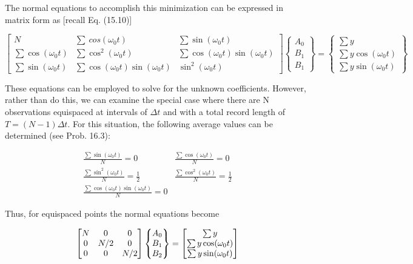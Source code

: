 \documentclass[../main.tex]{subfiles}
\begin{document}
\noindent The normal equations to accomplish this minimization can be expressed in matrix form as [recall Eq. (15.10)]

\begin{equation}
	\tag{16.12}
	\begin{bmatrix}
		N & \sum \ cos(\omega_0 t) & \sum \sin(\omega_0 t) \\
		\sum \cos(\omega_0 t) & \sum \cos^2 (\omega_0 t) & \sum \cos (\omega_0 t) \sin (\omega_0 t) \\
		\sum \sin(\omega_0 t) & \sum \cos (\omega_0 t) \sin (\omega_0 t) & \sin^2 (\omega_0 t)
	\end{bmatrix}
	\begin{Bmatrix}
		A_0 \\ B_1 \\ B_1
	\end{Bmatrix}
	=
	\begin{Bmatrix}
		\sum y \\ \sum y \cos(\omega_0 t) \\ \sum y \sin(\omega_0 t)
	\end{Bmatrix}
\end{equation}

These equations can be employed to solve for the unknown coefficients. However,
rather than do this, we can examine the special case where there are N observations equispaced at intervals of $\Delta t$ and with a total record length of $T = (N - 1)\Delta t$. For this situation, the following average values can be determined (see Prob. 16.3):

\begin{equation}
	\tag{16.13}
	\begin{matrix}
		\frac{\sum \sin (\omega_0 t)}{N} = 0 & \frac{\sum \cos (\omega_0 t)}{N} = 0 \\
		\frac{\sum \sin ^2 (\omega_0 t)}{N} = \frac{1}{2} & \frac{\sum \cos ^2 (\omega_0 t)}{N} = \frac{1}{2} \\
		\frac{\sum \cos (\omega_0 t) \sin(\omega_0 t)}{N} = 0
	\end{matrix}
\end{equation}

\noindent Thus, for equispaced points the normal equations become

\begin{equation}
	\notag
	\begin{bmatrix}
		N & 0 & 0 \\
		0 & N/2 & 0 \\
		0 & 0 & N/2
	\end{bmatrix}
	\begin{Bmatrix}
		A_0 \\ B_1 \\ B_2
	\end{Bmatrix}
	=
	\begin{bmatrix}
		\sum y \\
		\sum y \cos(\omega_0 t) \\
		\sum y \sin(\omega_0 t)
	\end{bmatrix}
\end{equation}
\end{document}

